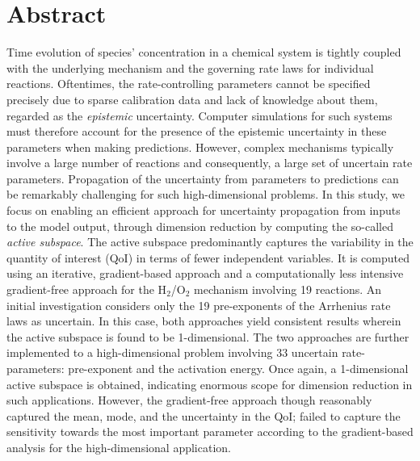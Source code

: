 \section*{Abstract}
Time evolution of species' concentration in a chemical system is tightly coupled
with the underlying mechanism and the governing rate laws for individual reactions.
Oftentimes, the rate-controlling parameters cannot be specified precisely 
due to sparse calibration data and lack of knowledge about them, regarded as
the \textit{epistemic} uncertainty. Computer simulations for such systems must
therefore account for the presence of the epistemic uncertainty in these parameters
when making predictions. However, complex mechanisms typically involve a large number of
reactions and consequently, a large set of uncertain rate parameters. Propagation of
the uncertainty from parameters to predictions can be remarkably challenging for
such high-dimensional problems. In this study, we focus on enabling an efficient
approach for uncertainty propagation from inputs to the model output,
through dimension reduction by computing the
so-called
\textit{active subspace}. The active subspace
 predominantly captures the variability in the quantity of
interest (QoI) in terms of fewer independent variables. 
It is computed using an iterative, gradient-based
approach and a computationally less intensive gradient-free approach for the 
H$_2$/O$_2$ mechanism involving 19 reactions. An initial investigation considers
only the 19 pre-exponents of the Arrhenius rate laws as uncertain. In this case, both
approaches yield consistent results wherein the active subspace is found to be 
1-dimensional. The two approaches are further implemented to a high-dimensional
problem involving 33 uncertain rate-parameters: pre-exponent and the activation
energy. Once again, a 1-dimensional active subspace is obtained, indicating
enormous scope for dimension reduction in such applications. However, the
gradient-free approach though reasonably captured the mean, mode, and the uncertainty
in the QoI; failed to capture the sensitivity towards the most
important parameter according to the gradient-based analysis for the high-dimensional
application.   
